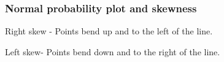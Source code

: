 \begin{frame}
\frametitle{Normal probability plot and skewness}

{
Right skew - Points bend up and to the left of the line.
}

{
Left skew- Points bend down and to the right of the line.
}


\end{frame}
